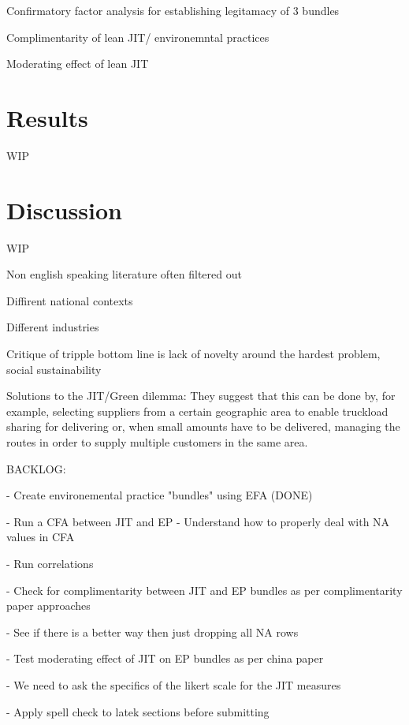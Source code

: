 \documentclass[]{article}
\begin{document}
Confirmatory factor analysis for establishing legitamacy of 3 bundles

Complimentarity of lean JIT/ environemntal practices

Moderating effect of lean JIT 

\section{Results}
WIP

\section{Discussion}
WIP

Non english speaking literature often filtered out

Diffirent national contexts

Different industries

Critique of tripple bottom line is lack of novelty around the hardest problem, social sustainability

Solutions to the JIT/Green dilemma: They suggest that this can be done by, for example, selecting suppliers from a certain geographic area to enable truckload sharing for delivering or, when small amounts have to be delivered, managing the routes in order to supply multiple customers in the same area. 

BACKLOG:

- Create environemental practice "bundles" using EFA (DONE)

- Run a CFA between JIT and EP
 - Understand how to properly deal with NA values in CFA

- Run correlations

- Check for complimentarity between JIT and EP bundles as per complimentarity paper approaches

- See if there is a better way then just dropping all NA rows

- Test moderating effect of JIT on EP bundles as per china paper

- We need to ask the specifics of the likert scale for the JIT measures

- Apply spell check to latek sections before submitting

\end{document}
